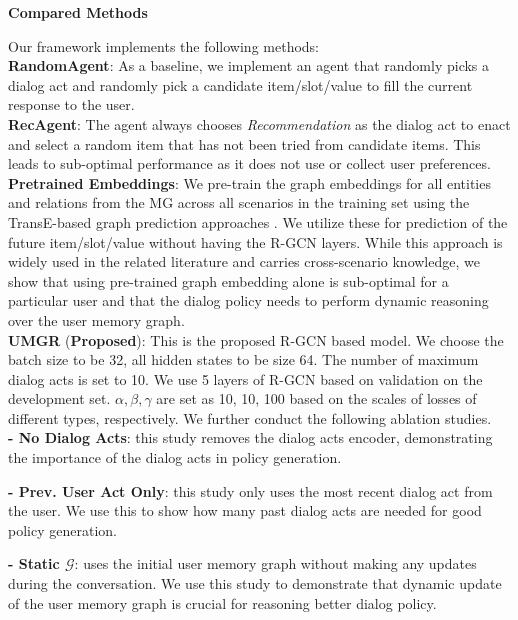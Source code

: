 \textbf{Compared Methods}

Our framework implements the following methods:\\
\noindent \textbf{RandomAgent}: As a baseline, we implement an agent that randomly picks a dialog act and randomly pick a candidate item/slot/value to fill the current response to the user.\\
\noindent \textbf{RecAgent}: The agent always chooses \textit{Recommendation} as the dialog act to enact and select a random item that has not been tried from candidate items. This leads to sub-optimal performance as it does not use or collect user preferences.\\
\noindent \textbf{Pretrained Embeddings}: 
We pre-train the graph embeddings for all entities and relations from the MG across all scenarios in the training set using the TransE-based graph prediction approaches \cite{Nickel+15}.
We utilize these for prediction of the future item/slot/value without having the R-GCN layers.
While this approach is widely used in the related literature and carries cross-scenario knowledge, we show that using pre-trained graph embedding alone is sub-optimal for a particular user and that the dialog policy needs to perform dynamic reasoning over the user memory graph.\\
\noindent \textbf{UMGR} (\textbf{Proposed}): This is the proposed R-GCN based model. We choose the batch size to be 32, all hidden states to be size 64. The number of maximum dialog acts is set to 10. We use 5 layers of R-GCN based on validation on the development set. $\alpha, \beta, \gamma$ are set as 10, 10, 100 based on the scales of losses of different types, respectively. 
We further conduct the following ablation studies.\\
\noindent \textbf{- No Dialog Acts}: this study removes the dialog acts encoder, demonstrating the importance of the dialog acts in policy generation.

\noindent \textbf{- Prev. User Act Only}: this study only uses the most recent dialog act from the user. We use this to show how many past dialog acts are needed for good policy generation.

\noindent \textbf{- Static $\mathcal{G}$}: uses the initial user memory graph without making any updates during the conversation. We use this study to demonstrate that dynamic update of the user memory graph is crucial for reasoning better dialog policy.\\

